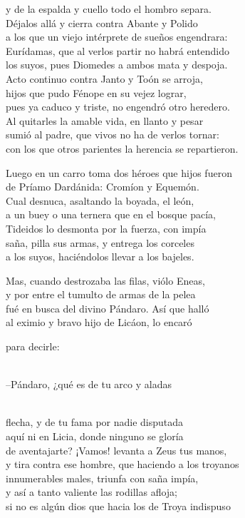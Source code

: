 \documentclass[11pt,twoside]{article}
\newcommand{\dlgo}[2]{\sbox{\dbox}{#1}\parbox[t]{\linewidth}{#1\strut\\[0pt]\hspace*{\wd\dbox}\hspace{\fontdimen2\font}#2\strut}}
\begin{document}
y de la espalda y cuello todo el hombro separa.\\
Déjalos allá y cierra contra Abante y Polido\\
a los que un viejo intérprete de sueños engendrara:\\
Eurídamas, que al verlos partir no habrá entendido\\
los suyos, pues Diomedes a ambos mata y despoja.\\
Acto continuo contra Janto y Toón se arroja,\\
hijos que pudo Fénope en su vejez lograr,\\
pues ya caduco y triste, no engendró otro heredero.\\
Al quitarles la amable vida, en llanto y pesar\\
sumió al padre, que vivos no ha de verlos tornar:\\
con los que otros parientes la herencia se repartieron.\par
Luego en un carro toma dos héroes que hijos fueron\\
de Príamo Dardánida: Cromíon y Equemón.\\
Cual desnuca, asaltando la boyada, el león,\\
a un buey o una ternera que en el bosque pacía,\\
Tideidos lo desmonta por la fuerza, con impía\\
saña, pilla sus armas, y entrega los corceles\\
a los suyos, haciéndolos llevar a los bajeles.\par
Mas, cuando destrozaba las filas, viólo Eneas,\\
y por entre el tumulto de armas de la pelea\\
fué en busca del divino Pándaro. Así que halló\\
al eximio y bravo hijo de Licáon, lo encaró\\
\dlgo{para decirle:}{--Pándaro, ¿qué es de tu arco y aladas}\\
flecha, y de tu fama por nadie disputada\\
aquí ni en Licia, donde ninguno se gloría\\
de aventajarte? ¡Vamos! levanta a Zeus tus manos,\\
y tira contra ese hombre, que haciendo a los troyanos\\
innumerables males, triunfa con saña impía,\\
y así a tanto valiente las rodillas afloja;\\
si no es algún dios que hacia los de Troya indispuso\\
\end{document}
